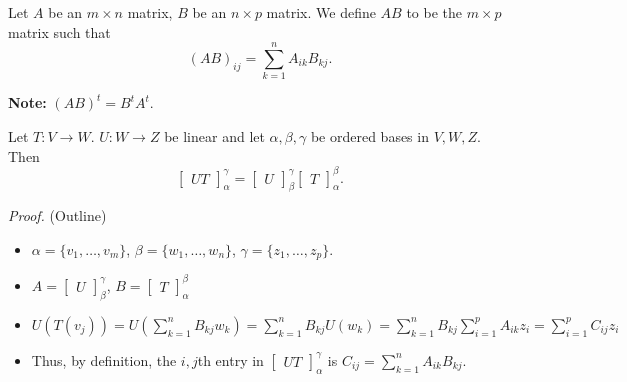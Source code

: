 \documentclass[12pt]{article}
\newenvironment{theorem}[2][Theorem]{\begin{trivlist}
\item[\hskip \labelsep {\bfseries #1}\hskip \labelsep {\bfseries #2.}]}{\end{trivlist}}
\newenvironment{definition}[2][Definition]{\begin{trivlist}
\item[\hskip \labelsep {\bfseries #1}\hskip \labelsep {\bfseries #2}]}{\end{trivlist}}
\begin{document}
\begin{definition}{5}
Let $A$ be an $m \times n$ matrix, $B$ be an $n \times p$ matrix. We define $AB$ to be the $m \times p$ matrix such that $$(AB)_{ij} = \sum_{k = 1}^nA_{ik}B_{kj}.$$
\end{definition}

\noindent\textbf{Note:} $(AB)^t = B^tA^t.$

\begin{theorem}{2.11}
Let $T : V \to W$. $U : W \to Z$ be linear and let $\alpha, \beta, \gamma$ be ordered bases in $V, W, Z$. Then $$\begin{bmatrix} UT \end{bmatrix}_\alpha^\gamma = \begin{bmatrix} U \end{bmatrix}_\beta^\gamma\begin{bmatrix} T \end{bmatrix}_\alpha^\beta.$$
\end{theorem}

\textit{Proof.} (Outline)
\begin{itemize}
    \item $\alpha = \{v_1, \dots, v_m\}$, $\beta = \{w_1, \dots, w_n\}$, $\gamma = \{z_1, \dots, z_p\}$.
    \item $A = \begin{bmatrix} U \end{bmatrix}_\beta^\gamma$, $B = \begin{bmatrix} T \end{bmatrix}_\alpha^\beta$
    \item $U(T(v_j)) = U\left( \sum_{k = 1}^n B_{kj}w_k \right) = \sum_{k = 1}^n B_{kj}U(w_k) = \sum_{k = 1}^n B_{kj} \sum_{i = 1}^p A_{ik}z_i = \sum_{i = 1}^p C_{ij}z_i$
    \item Thus, by definition, the $i,j$th entry in $\begin{bmatrix} UT \end{bmatrix}_\alpha^\gamma$ is $C_{ij} = \sum_{k = 1}^nA_{ik}B_{kj}$.
\end{itemize}
\end{document}
